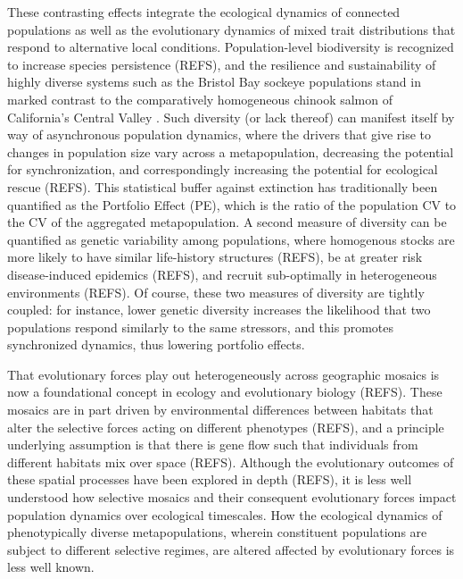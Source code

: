 \documentclass[twocolumn,preprintnumbers,amsmath,amssymb,superscriptaddress]{revtex4}
\begin{document}
These contrasting effects integrate the ecological dynamics of connected populations as well as the evolutionary dynamics of mixed trait distributions that respond to alternative local conditions.
Population-level biodiversity is recognized to increase species persistence (REFS), and the resilience and sustainability of highly diverse systems such as the Bristol Bay sockeye populations stand in marked contrast to the comparatively homogeneous chinook salmon of California's Central Valley \cite{Anonymous:2014ku,Satterthwaite:2015ge}.
Such diversity (or lack thereof) can manifest itself by way of asynchronous population dynamics, where the drivers that give rise to changes in population size vary across a metapopulation, decreasing the potential for synchronization, and correspondingly increasing the potential for ecological rescue (REFS).
This statistical buffer against extinction has traditionally been quantified as the Portfolio Effect (PE), which is the ratio of the population CV to the CV of the aggregated metapopulation.
A second measure of diversity can be quantified as genetic variability among populations, where homogenous stocks are more likely to have similar life-history structures (REFS), be at greater risk disease-induced epidemics (REFS), and recruit sub-optimally in heterogeneous environments (REFS).
Of course, these two measures of diversity are tightly coupled: for instance, lower genetic diversity increases the likelihood that two populations respond similarly to the same stressors, and this promotes synchronized dynamics, thus lowering portfolio effects.

That evolutionary forces play out heterogeneously across geographic mosaics is now a foundational concept in ecology and evolutionary biology (REFS).
These mosaics are in part driven by environmental differences between habitats that alter the selective forces acting on different phenotypes (REFS), and a principle underlying assumption is that there is gene flow such that individuals from different habitats mix over space (REFS).
Although the evolutionary outcomes of these spatial processes have been explored in depth (REFS), it is less well understood how selective mosaics and their consequent evolutionary forces impact population dynamics over ecological timescales.
How the ecological dynamics of phenotypically diverse metapopulations, wherein constituent populations are subject to different selective regimes, are altered affected by evolutionary forces is less well known. %
\end{document}
